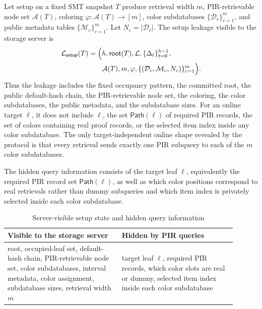 \begin{definition}
\label{def:leakagefunction}
Let setup on a fixed SMT snapshot $T$ produce retrieval width $m$, PIR-retrievable node set $\mathcal{A}(T)$, coloring $\varphi:\mathcal{A}(T)\to[m]$, color subdatabases $\{\mathcal{D}_c\}_{c=1}^{m}$, and public metadata tables $\{\mathcal{M}_c\}_{c=1}^{m}$. Let $N_c=|\mathcal{D}_c|$. The setup leakage visible to the storage server is
\[
\begin{aligned}
\mathcal{L}_{\mathsf{setup}}(T)=
\Bigl(&h,\mathsf{root}(T),\mathcal{L},
\{\Delta_t\}_{t=0}^{h-1},\\
&\mathcal{A}(T),m,\varphi,
\{(\mathcal{D}_c,\mathcal{M}_c,N_c)\}_{c=1}^{m}
\Bigr).
\end{aligned}
\]
Thus the leakage includes the fixed occupancy pattern, the committed root, the public default-hash chain, the PIR-retrievable node set, the coloring, the color subdatabases, the public metadata, and the subdatabase sizes. For an online target $\ell$, it does not include $\ell$, the set $\mathsf{Path}(\ell)$ of required PIR records, the set of colors containing real proof records, or the selected item index inside any color subdatabase. The only target-independent online shape revealed by the protocol is that every retrieval sends exactly one PIR subquery to each of the $m$ color subdatabases.
\end{definition}

The hidden query information consists of the target leaf $\ell$, equivalently the required PIR record set $\mathsf{Path}(\ell)$, as well as which color positions correspond to real retrievals rather than dummy subqueries and which item index is privately selected inside each color subdatabase.

\begin{table}[t]
\centering
\caption{Server-visible setup state and hidden query information}
\label{tab:leakage}
\scriptsize
\setlength{\tabcolsep}{4pt}
\begin{tabular}{>{\raggedright\arraybackslash}p{0.45\linewidth}>{\raggedright\arraybackslash}p{0.45\linewidth}}
\toprule
Visible to the storage server & Hidden by PIR queries \\
\midrule
root, occupied-leaf set, default-hash chain, PIR-retrievable node set, color subdatabases, interval metadata, color assignment, subdatabase sizes, retrieval width $m$
&
target leaf $\ell$, required PIR records, which color slots are real or dummy, selected item index inside each color subdatabase \\
\bottomrule
\end{tabular}
\end{table}

